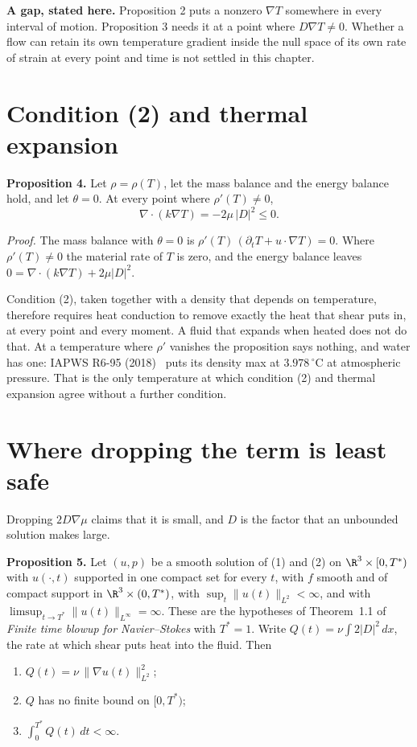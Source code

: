 \textbf{A gap, stated here.} Proposition 2 puts a nonzero $\nabla T$ somewhere in every interval of
motion. Proposition 3 needs it at a point where $D\nabla T \neq 0$. Whether a flow can retain its own
temperature gradient inside the null space of its own rate of strain at every point and time is not
settled in this chapter.

\section{Condition (2) and thermal expansion}

\textbf{Proposition 4.} Let $\rho = \rho(T)$, let the mass balance and the energy balance hold, and
let $\theta = 0$. At every point where $\rho'(T) \neq 0$,
\[
\nabla\cdot(k\nabla T) = -2\mu\,|D|^2 \le 0 .
\]

\emph{Proof.} The mass balance with $\theta = 0$ is $\rho'(T)\,(\partial_t T + u\cdot\nabla T) = 0$.
Where $\rho'(T)\neq 0$ the material rate of $T$ is zero, and the energy balance leaves
$0 = \nabla\cdot(k\nabla T) + 2\mu|D|^2$. \hfill\qedsymbol

Condition (2), taken together with a density that depends on temperature, therefore requires heat
conduction to remove exactly the heat that shear puts in, at every point and every moment. A fluid
that expands when heated does not do that. At a temperature where $\rho'$ vanishes the proposition
says nothing, and water has one: IAPWS R6-95 (2018)~\cite{src:IAPWS-R6-95-2018} puts its density max at $3.978\,^\circ$C at
atmospheric pressure. That is the only temperature at
which condition (2) and thermal expansion agree without a further condition.

\section{Where dropping the term is least safe}

Dropping $2D\nabla\mu$ claims that it is small, and $D$ is the factor that an unbounded solution
makes large.

\textbf{Proposition 5.} Let $(u,p)$ be a smooth solution of (1) and (2) on $\R^3\times[0,T^*)$ with
$u(\cdot,t)$ supported in one compact set for every $t$, with $f$ smooth and of compact support in
$\R^3\times(0,T^*)$, with $\sup_t\|u(t)\|_{L^2} < \infty$, and with
$\limsup_{t\to T^*}\|u(t)\|_{L^\infty} = \infty$. These are the hypotheses of Theorem~1.1 of
\emph{Finite time blowup for Navier--Stokes} with $T^* = 1$. Write $Q(t) = \nu\int 2|D|^2\,dx$, the
rate at which shear puts heat into the fluid. Then
\begin{enumerate}
\item $Q(t) = \nu\,\|\nabla u(t)\|_{L^2}^2$;
\item $Q$ has no finite bound on $[0,T^*)$;
\item $\int_0^{T^*} Q(t)\,dt < \infty$.
\end{enumerate}

